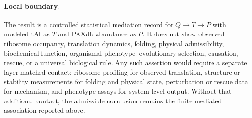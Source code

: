 \paragraph{Local boundary.}
The result is a controlled statistical mediation record for $Q \to T \to P$ with modeled tAI as $T$ and PAXdb abundance as $P$. It does not show observed ribosome occupancy, translation dynamics, folding, physical admissibility, biochemical function, organismal phenotype, evolutionary selection, causation, rescue, or a universal biological rule. Any such assertion would require a separate layer-matched contact: ribosome profiling for observed translation, structure or stability measurements for folding and physical state, perturbation or rescue data for mechanism, and phenotype assays for system-level output. Without that additional contact, the admissible conclusion remains the finite mediated association reported above.
